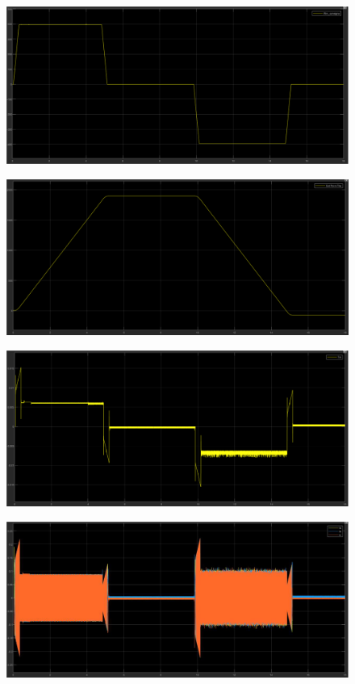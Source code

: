 \documentclass{article}
\begin{document}
\begin{figure}[H]
    \centering
    \includegraphics[width=1\textwidth]{5.2..5.1.a.2.png}
\end{figure}

\begin{figure}[H]
    \centering
    \includegraphics[width=1\textwidth]{5.2..5.1.a.3.png}
\end{figure}

\begin{figure}[H]
    \centering
    \includegraphics[width=1\textwidth]{5.2..5.1.a.4.png}
\end{figure}

\begin{figure}[H]
    \centering
    \includegraphics[width=1\textwidth]{5.2..5.1.a.5.png}
\end{figure}
\end{document}
